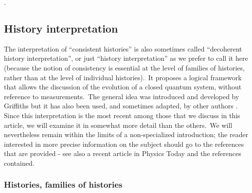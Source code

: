 \documentclass[12pt,onecolumn]{article}%
\begin{document}
.

\subsection{History interpretation}

\label{histories}

The interpretation of ``consistent histories'' is also sometimes called
``decoherent history interpretation'', or just ``history interpretation'' as
we prefer to call it here (because the notion of consistency is essential at
the level of families of histories, rather than at the level of individual
histories).\ It proposes a logical framework that allows the discussion of the
evolution of a closed quantum system, without reference to measurements.\ The
general idea was introduced and developed by Griffiths \cite{Griffiths} but it
has also been used, and sometimes adapted, by other authors \cite{Omnes-2}
\cite{Gell-Mann} \cite{Omnes-3}. Since this interpretation is the most recent
among those that we discuss in this article, we will examine it in somewhat
more detail than the others.\ We will nevertheless remain within the limits of
a non-specialized introduction; the reader interested in more precise
information on the subject should go to the references that are provided - see
also a recent article in Physics Today \cite{G-O} and the references contained.

\subsubsection{Histories, families of histories}
\end{document}

